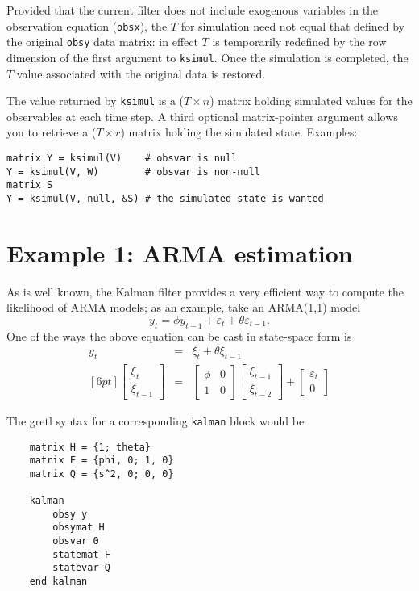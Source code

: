 \documentclass[a4paper]{article}
\begin{document}
Provided that the current filter does not include exogenous variables
in the observation equation (\texttt{obsx}), the $T$ for simulation
need not equal that defined by the original \texttt{obsy} data matrix:
in effect $T$ is temporarily redefined by the row dimension of the
first argument to \texttt{ksimul}.  Once the simulation is completed,
the $T$ value associated with the original data is restored.

The value returned by \texttt{ksimul} is a ($T \times n$) matrix
holding simulated values for the observables at each time step.  A
third optional matrix-pointer argument allows you to retrieve a ($T
\times r$) matrix holding the simulated state.  Examples:
%
\begin{verbatim}
matrix Y = ksimul(V)    # obsvar is null
Y = ksimul(V, W)        # obsvar is non-null
matrix S
Y = ksimul(V, null, &S) # the simulated state is wanted
\end{verbatim}

\section{Example 1: ARMA estimation}
\label{sec:example_arma}

As is well known, the Kalman filter provides a very efficient way to
compute the likelihood of ARMA models; as an example, take an
ARMA(1,1) model
\[
  y_t = \phi y_{t-1} + \varepsilon_t + \theta \varepsilon_{t-1} .
\]
One of the ways the above equation can be cast in state-space form is
\begin{eqnarray*}
  y_t & = & \xi_t + \theta \xi_{t-1} \\ [6pt]
  \left[ \begin{array}{c} \xi_t \\ \xi_{t-1} \end{array} \right] & = &
  \left[ \begin{array}{cc} \phi & 0 \\ 1 & 0 \end{array} \right]
  \left[ \begin{array}{c} \xi_{t-1} \\ \xi_{t-2} \end{array} \right] +
  \left[ \begin{array}{c} \varepsilon_t \\ 0 \end{array} \right] 
\end{eqnarray*}

The gretl syntax for a corresponding \texttt{kalman} block would be
\begin{verbatim}
    matrix H = {1; theta}
    matrix F = {phi, 0; 1, 0}
    matrix Q = {s^2, 0; 0, 0}

    kalman
        obsy y
        obsymat H
        obsvar 0
        statemat F
        statevar Q
    end kalman
\end{verbatim}
\end{document}
